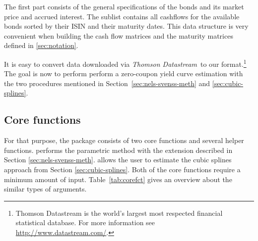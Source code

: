 The first part consists of the general specifications of the bonds and its market price and accrued interest. The sublist  contains all cashflows for the available bonds sorted by their ISIN and their maturity dates. This data structure is very convenient when building the cash flow matrices and the maturity matrices defined in \ref{sec:notation}.

It is easy to convert data downloaded via \emph{Thomson Datastream}\texttrademark\, to our format.\footnote{Thomson Datastream is the world's largest most respected financial statistical database. For more information see \url{http://www.datastream.com/}.} The goal is now to perform perform a zero-coupon yield curve estimation with the two procedures mentioned in Section~\ref{sec:nels-svenss-meth} and \ref{sec:cubic-splines}.

\newpage
\subsection{Core functions}
\label{sec:main-functions}

For that purpose, the package  consists of two core functions and several helper functions.  performs the parametric \cite{Nelson1987} method with the \cite{Svensson1994} extension described in Section \ref{sec:nels-svenss-meth}.   allows the user to estimate the \cite{McCulloch1975} cubic splines approach from Section \ref{sec:cubic-splines}. Both of the core functions require a minimum amount of input. Table~\ref{tab:corefct} gives an overview about the similar types of arguments.

